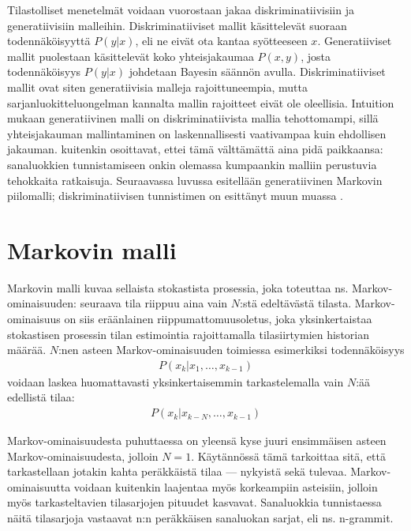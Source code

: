 \documentclass[utf8,bachelor,manualbib]{gradu3}
\begin{document}
Tilastolliset menetelmät voidaan vuorostaan jakaa diskriminatiivisiin ja generatiivisiin malleihin. Diskriminatiiviset mallit käsittelevät suoraan todennäköisyyttä $P(y|x)$, eli ne eivät ota kantaa syötteeseen $x$. Generatiiviset mallit puolestaan käsittelevät koko yhteisjakaumaa $P(x,y)$, josta todennäköisyys $P(y|x)$ johdetaan Bayesin säännön avulla. Diskriminatiiviset mallit ovat siten generatiivisia malleja rajoittuneempia, mutta sarjanluokitteluongelman kannalta mallin rajoitteet eivät ole oleellisia. Intuition mukaan generatiivinen malli on diskriminatiivista mallia tehottomampi, sillä yhteisjakauman mallintaminen on laskennallisesti vaativampaa kuin ehdollisen jakauman.  kuitenkin osoittavat, ettei tämä välttämättä aina pidä paikkaansa: sanaluokkien tunnistamiseen onkin olemassa kumpaankin malliin perustuvia tehokkaita ratkaisuja. Seuraavassa luvussa esitellään generatiivinen Markovin piilomalli; diskriminatiivisen tunnistimen on esittänyt muun muassa \citet{ratnaparkhi1996}.

\section{Markovin malli}

Markovin malli \citep[mm.][]{rabiner1989} kuvaa sellaista stokastista prosessia, joka toteuttaa ns. Markov-ominaisuuden: seuraava tila riippuu aina vain $N$:stä edeltävästä tilasta. Markov-ominaisuus on siis eräänlainen riippumattomuusoletus, joka yksinkertaistaa stokastisen prosessin tilan estimointia rajoittamalla tilasiirtymien historian määrää. $N$:nen asteen Markov-ominaisuuden toimiessa esimerkiksi todennäköisyys
\begin{align}
P(x_k | x_1, \ldots, x_{k-1})
\end{align}
voidaan laskea huomattavasti yksinkertaisemmin tarkastelemalla vain $N$:ää edellistä tilaa:
\begin{align}
P(x_k | x_{k - N }, \ldots, x_{k-1})
\end{align}

Markov-ominaisuudesta puhuttaessa on yleensä kyse juuri ensimmäisen asteen Markov-ominaisuudesta, jolloin $N=1$. Käytännössä tämä tarkoittaa sitä, että tarkastellaan jotakin kahta peräkkäistä tilaa --- nykyistä sekä tulevaa. Markov-ominaisuutta voidaan kuitenkin laajentaa myös korkeampiin asteisiin, jolloin myös tarkasteltavien tilasarjojen pituudet kasvavat. Sanaluokkia tunnistaessa näitä tilasarjoja vastaavat n:n peräkkäisen sanaluokan sarjat, eli ns. n-grammit.   
\end{document}
